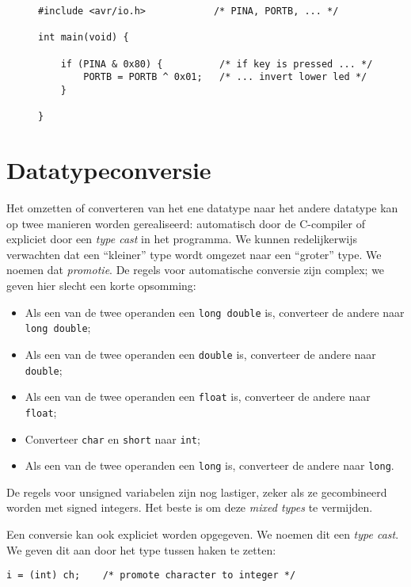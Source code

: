\begin{figure}[!ht]
\begin{lstlisting}[caption=bla]
#include <avr/io.h>            /* PINA, PORTB, ... */

int main(void) {

    if (PINA & 0x80) {          /* if key is pressed ... */
        PORTB = PORTB ^ 0x01;   /* ... invert lower led */
    }

}
\end{lstlisting}
\end{figure}


\section{Datatypeconversie}
Het omzetten of converteren van het ene datatype naar het andere datatype kan op twee manieren worden gerealiseerd: automatisch door de C-compiler of expliciet door een \textsl{type cast} in het programma. We kunnen redelijkerwijs verwachten dat een ``kleiner'' type wordt omgezet naar een ``groter'' type. We noemen dat \textsl{promotie}. De regels voor automatische conversie zijn complex; we geven hier slecht een korte opsomming:

\begin{itemize}
\item Als een van de twee operanden een \texttt{long double} is, converteer de andere naar \texttt{long double};
\item Als een van de twee operanden een \texttt{double} is, converteer de andere naar \texttt{double};
\item Als een van de twee operanden een \texttt{float} is, converteer de andere naar \texttt{float};
\item Converteer \texttt{char} en \texttt{short} naar \texttt{int};
\item Als een van de twee operanden een \texttt{long} is, converteer de andere naar \texttt{long}.
\end{itemize}

De regels voor unsigned variabelen zijn nog lastiger, zeker als ze gecombineerd worden met signed integers. Het beste is om deze \textsl{mixed types} te vermijden.

Een conversie kan ook expliciet worden opgegeven. We noemen dit een \textsl{type cast}. We geven dit aan door het type tussen haken te zetten:

\hspace*{1em}\texttt{i = (int) ch; \ \ \  /* promote character to integer */}

